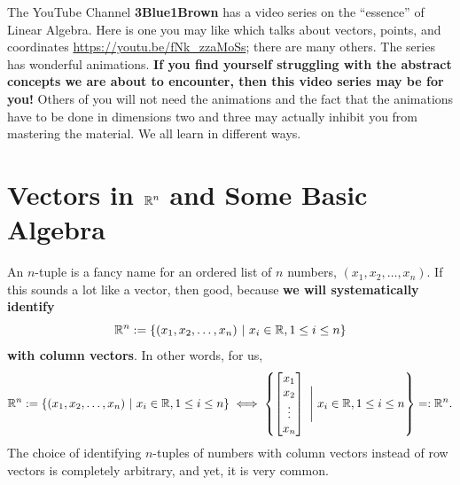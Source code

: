 \begin{tcolorbox}[title=\textcolor{red}{\bf \Large Need Intuition?}]
 The YouTube Channel \textbf{3Blue1Brown} has a video series on the ``essence'' of Linear Algebra. Here is one you may like which talks about vectors, points, and coordinates \url{https://youtu.be/fNk_zzaMoSs}; there are many others. The series has wonderful animations. \textbf{If you find yourself struggling with the abstract concepts we are about to encounter, then this video series may be for you!} Others of you will not need the animations and the fact that the animations have to be done in dimensions two and three may actually inhibit you from mastering the material. We all learn in different ways. 
\end{tcolorbox}



\section{Vectors in $\mathbb R^n$ and Some Basic Algebra}

An $n$-tuple is a fancy name for an ordered list of $n$ numbers, $(x_1, x_2, \ldots, x_n)$. If this sounds a lot like a vector, then good, because \textbf{we will systematically identify}
\begin{equation}
\mathbb R^n:=\{(x_1, x_2, \ldots, x_n)~|~x_i \in \mathbb R, 1\le i \le n \} 
\end{equation}
\textbf{with column vectors}. In other words, for us,
\begin{equation}
\mathbb R^n:=\{(x_1, x_2, \ldots, x_n)~|~x_i \in \mathbb R, 1\le i \le n \} \iff \left\{\begin{bmatrix} x_1 \\ x_2 \\ \vdots \\ x_n\end{bmatrix} ~\Bigg|~  x_i \in \mathbb R, 1\le i \le n \right\}=:\mathbb R^n.
\end{equation}
The choice of identifying $n$-tuples of numbers with column vectors instead of row vectors is completely arbitrary, and yet, it is very common.

